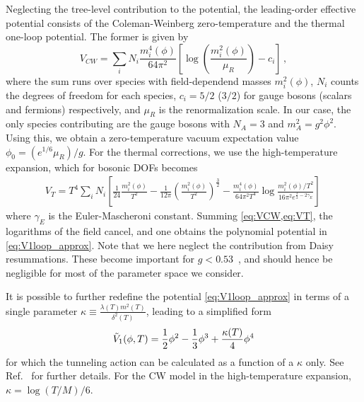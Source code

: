 \documentclass{article}
\begin{document}
Neglecting the tree-level contribution to the potential, the leading-order effective potential consists of the Coleman-Weinberg zero-temperature and the thermal one-loop potential.
The former is given by~\cite{Coleman:1973jx}
\begin{equation}
    V_{CW} = \sum_{i} N_i \frac{m_i^4(\phi)}{64\pi^2}\left[\log\left(\frac{m_i^2(\phi)}{\mu_R}\right)-c_i\right] \,,
    \label{eq:VCW}
\end{equation}
where the sum runs over species with field-dependend masses $m_i^2(\phi)$, $N_i$ counts the degrees of freedom for each species, $c_i=5/2$ ($3/2$) for gauge bosons (scalars and fermions) respectively, and $\mu_R$ is the renormalization scale.
In our case, the only species contributing are the gauge bosons with $N_A = 3$ and $m_A^2 = g^2 \phi^2$.
Using this, we obtain a zero-temperature vacuum expectation value $\phi_0=(e^{1/6} \mu_R)/g$.
For the thermal corrections, we use the high-temperature expansion, which for bosonic DOFs becomes
\begin{align}
    V_T = T^4 \sum_i N_i \left[\frac{1}{24} \frac{m_i^2(\phi)}{T^2} - \frac{1}{12 \pi} \left(\frac{m_i^2(\phi)}{T^2}\right)^\frac{3}{2} - \frac{m_i^4(\phi)}{64 \pi^2 T^4} \log\frac{m_i^2(\phi)/T^2}{16 \pi^2 e^{\frac{3}{2}-2\gamma_E}} \right] \,
    \label{eq:VT}
\end{align}
where $\gamma_E$ is the Euler-Mascheroni constant. 
Summing \cref{eq:VCW,eq:VT}, the logarithms of the field cancel, and one obtains the polynomial potential in \cref{eq:V1loop_approx}.
Note that we here neglect the contribution from Daisy resummations.
These become important for $g<0.53$~\cite{Levi:2022bzt}, and should hence be negligible for most of the parameter space we consider.

It is possible to further redefine the potential \cref{eq:V1loop_approx} in terms of a single parameter $\kappa\equiv\frac{\lambda(T) m^2(T)}{\delta^2(T)}$, leading to a simplified form
\begin{equation}
    \label{eq:Vtilde}
    \Tilde{V}_1(\phi,T)= \frac{1}{2}\phi^2-\frac{1}{3}\phi^3+\frac{\kappa(T)}{4}\phi^4
\end{equation}
for which the tunneling action can be calculated as a function of a $\kappa$ only.
See Ref.~\cite{Levi:2022bzt} for further details.
For the CW model in the high-temperature expansion, $\kappa = \log(T/M)/6$.
\end{document}
